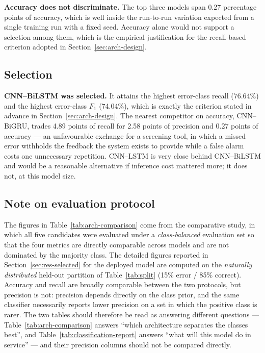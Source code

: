 \textbf{Accuracy does not discriminate.} The top three models span 0.27
percentage points of accuracy, which is well inside the run-to-run variation
expected from a single training run with a fixed seed. Accuracy alone would not
support a selection among them, which is the empirical justification for the
recall-based criterion adopted in Section~\ref{sec:arch-design}.

\subsection{Selection}

\textbf{CNN--BiLSTM was selected.} It attains the highest error-class recall
(76.64\%) and the highest error-class $F_1$ (74.04\%), which is exactly the
criterion stated in advance in Section~\ref{sec:arch-design}. The nearest
competitor on accuracy, CNN--BiGRU, trades 4.89 points of recall for 2.58 points
of precision and 0.27 points of accuracy --- an unfavourable exchange for a
screening tool, in which a missed error withholds the feedback the system exists
to provide while a false alarm costs one unnecessary repetition. CNN--LSTM is
very close behind CNN--BiLSTM and would be a reasonable alternative if
inference cost mattered more; it does not, at this model size.

\subsection{Note on evaluation protocol}

The figures in Table~\ref{tab:arch-comparison} come from the comparative study,
in which all five candidates were evaluated under a \emph{class-balanced}
evaluation set so that the four metrics are directly comparable across models
and are not dominated by the majority class. The detailed figures reported in
Section~\ref{sec:res-selected} for the deployed model are computed on the
\emph{naturally distributed} held-out partition of Table~\ref{tab:split}
(15\% error / 85\% correct). Accuracy and recall are broadly comparable between
the two protocols, but precision is not: precision depends directly on the class
prior, and the same classifier necessarily reports lower precision on a set in
which the positive class is rarer. The two tables should therefore be read as
answering different questions --- Table~\ref{tab:arch-comparison} answers
``which architecture separates the classes best'', and
Table~\ref{tab:classification-report} answers ``what will this model do in
service'' --- and their precision columns should not be compared directly.

